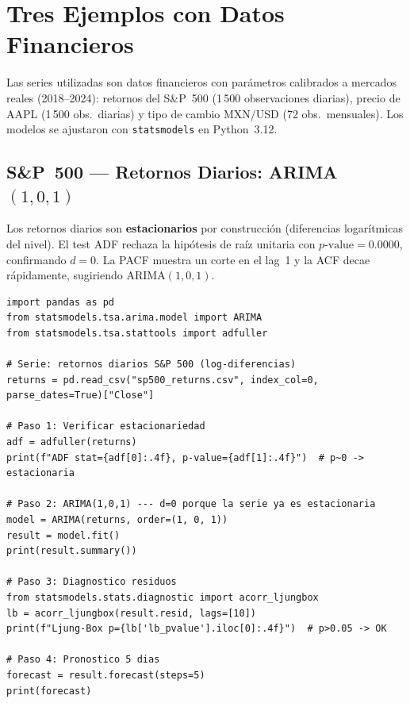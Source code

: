 \documentclass[12pt,letterpaper]{article}
\begin{document}
\newpage
\section{Tres Ejemplos con Datos Financieros}

Las series utilizadas son datos financieros con parámetros calibrados a mercados reales
(2018--2024): retornos del S\&P~500 (1\,500 observaciones diarias), precio de AAPL
(1\,500 obs.\ diarias) y tipo de cambio MXN/USD (72 obs.\ mensuales).
Los modelos se ajustaron con \texttt{statsmodels} en Python~3.12.

\subsection{S\&P~500 --- Retornos Diarios: ARIMA$(1,0,1)$}

Los retornos diarios son \textbf{estacionarios} por construcción (diferencias logarítmicas
del nivel). El test ADF rechaza la hipótesis de raíz unitaria con
$p\text{-value} = 0.0000$, confirmando $d=0$.
La PACF muestra un corte en el lag~1 y la ACF decae rápidamente, sugiriendo ARIMA$(1,0,1)$.

\begin{lstlisting}[caption={Ejemplo 1: S\&P 500 retornos diarios ARIMA(1,0,1)}]
import pandas as pd
from statsmodels.tsa.arima.model import ARIMA
from statsmodels.tsa.stattools import adfuller

# Serie: retornos diarios S&P 500 (log-diferencias)
returns = pd.read_csv("sp500_returns.csv", index_col=0, parse_dates=True)["Close"]

# Paso 1: Verificar estacionariedad
adf = adfuller(returns)
print(f"ADF stat={adf[0]:.4f}, p-value={adf[1]:.4f}")  # p~0 -> estacionaria

# Paso 2: ARIMA(1,0,1) --- d=0 porque la serie ya es estacionaria
model = ARIMA(returns, order=(1, 0, 1))
result = model.fit()
print(result.summary())

# Paso 3: Diagnostico residuos
from statsmodels.stats.diagnostic import acorr_ljungbox
lb = acorr_ljungbox(result.resid, lags=[10])
print(f"Ljung-Box p={lb['lb_pvalue'].iloc[0]:.4f}")  # p>0.05 -> OK

# Paso 4: Pronostico 5 dias
forecast = result.forecast(steps=5)
print(forecast)
\end{lstlisting}
\end{document}
